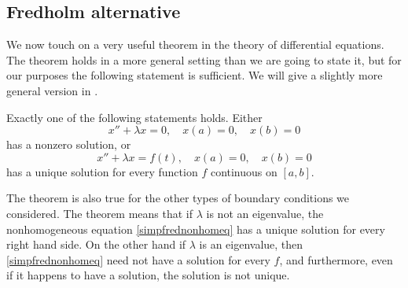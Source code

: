\documentclass[12pt]{book}
\begin{document}
%



\subsection{Fredholm alternative}

We now touch on a very useful theorem in the theory of differential
equations.  The theorem holds in a more general setting than we are
going to state it, but for our purposes the following statement is
sufficient.  We will give a slightly more general version in
.

\begin{theorem}
\label{thm:fredholmsimple}
Exactly one of the following statements holds.
Either
\begin{equation} \label{simpfredhomeq}
x'' + \lambda x = 0, \quad x(a) = 0, \quad x(b) = 0
\end{equation}
has a nonzero solution, or
\begin{equation} \label{simpfrednonhomeq}
x'' + \lambda x = f(t), \quad x(a) = 0, \quad x(b) = 0
\end{equation}
has a unique solution for every function $f$ continuous on $[a,b]$.
\end{theorem}

The theorem is also true for the other types of
boundary conditions we considered.
The theorem means that if $\lambda$ is not an eigenvalue, the nonhomogeneous
equation \eqref{simpfrednonhomeq} has a unique solution for every right hand
side.  On the other hand if $\lambda$ is an eigenvalue, then 
\eqref{simpfrednonhomeq} need not have a solution for every $f$,
and furthermore,
even if it happens to have a solution, the solution is not
unique.
\end{document}
